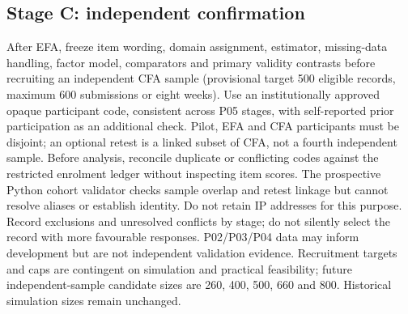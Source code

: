 \subsection{Stage C: independent confirmation}
After EFA, freeze item wording, domain assignment, estimator, missing-data handling, factor model, comparators and primary validity contrasts before recruiting an independent CFA sample (provisional target 500 eligible records, maximum 600 submissions or eight weeks). Use an institutionally approved opaque participant code, consistent across P05 stages, with self-reported prior participation as an additional check. Pilot, EFA and CFA participants must be disjoint; an optional retest is a linked subset of CFA, not a fourth independent sample. Before analysis, reconcile duplicate or conflicting codes against the restricted enrolment ledger without inspecting item scores. The prospective Python cohort validator checks sample overlap and retest linkage but cannot resolve aliases or establish identity. Do not retain IP addresses for this purpose. Record exclusions and unresolved conflicts by stage; do not silently select the record with more favourable responses. P02/P03/P04 data may inform development but are not independent validation evidence. Recruitment targets and caps are contingent on simulation and practical feasibility; future independent-sample candidate sizes are 260, 400, 500, 660 and 800. Historical simulation sizes remain unchanged.

